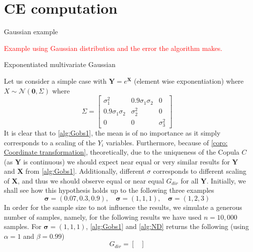 \documentclass[../Thesis.tex]{subfiles}
\begin{document}


\section{CE computation}\label{sec:gaussian MI error}
Gaussian example

\textcolor{red}{Example using Gaussian distribution and the error the algorithm makes.}


\begin{example} \label{ex:1}
    Exponentiated multivariate Gaussian

    Let us consider a simple case with $\mathbf{Y} = e^{\mathbf{X}}$ (element wise exponentiation) where $X \sim \mathcal{N}\left(\mathbf{0}, \Sigma\right)$ where
    $$\Sigma = \begin{bmatrix}
            \sigma_1^2           & 0.9\sigma_1\sigma_2 & 0          \\
            0.9 \sigma_1\sigma_2 & \sigma_2^2          & 0          \\
            0                    & 0                   & \sigma_3^2
        \end{bmatrix}$$
    It is clear that to \autoref{alg:Gobs1}, the mean is of no importance as it simply corresponds to a scaling of the $Y_i$ variables. Furthermore, because of \autoref{coro: Coordinate transformation}, theoretically, due to the uniqueness of the Copula $C$ (as $\boldsymbol Y$ is continuous) we should expect near equal or very similar results for $\boldsymbol Y$ and $\boldsymbol X$ from \autoref{alg:Gobs1}. Additionally, different $\sigma$ corresponds to different scaling of $\boldsymbol X$, and thus we should observe equal or near equal $G_{dir}$ for all $\boldsymbol Y$. Initially, we shall see how this hypothesis holds up to the following three examples
    $$
        \boldsymbol\sigma = (0.07, 0.3, 0.9), \quad
        \boldsymbol\sigma = (1,1,1), \quad
        \boldsymbol\sigma = (1,2,3)
    $$
    In order for the sample size to not influence the results, we simulate a generous number of samples, namely, for the following results we have used $n = 10{,}000$ samples. For $\boldsymbol\sigma = (1,1,1)$, \autoref{alg:Gobs1} and \autoref{alg:ND} returns the following (using $\alpha = 1$ and $\beta = 0.99$)
    \begin{equation} \label{eq:s medium G_dir}
        G_{dir} =
        \begin{bmatrix}

\end{bmatrix}
\end{equation}
\end{example}
\end{document}
